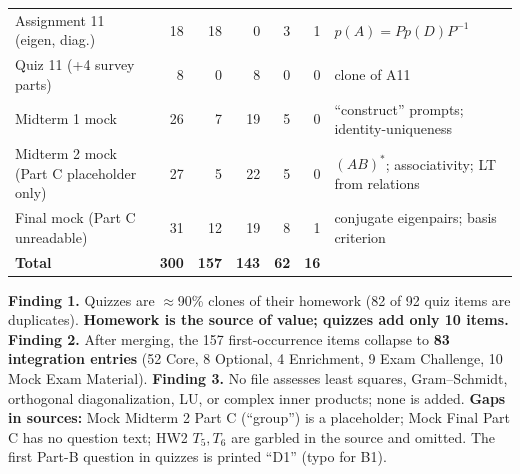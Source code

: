 \documentclass[9pt]{article}
\begin{document}
{\begin{longtable}{@{}p{4.1cm}rrrrr p{6.3cm}@{}}
Assignment 11 (eigen, diag.) & 18 & 18 & 0 & 3 & 1 & $p(A)=Pp(D)P^{-1}$\\
Quiz 11 (+4 survey parts) & 8 & 0 & 8 & 0 & 0 & clone of A11\\\midrule
Midterm 1 mock & 26 & 7 & 19 & 5 & 0 & ``construct'' prompts; identity-uniqueness\\
Midterm 2 mock (Part C placeholder only) & 27 & 5 & 22 & 5 & 0 & $(AB)^*$; associativity; LT from relations\\
Final mock (Part C unreadable) & 31 & 12 & 19 & 8 & 1 & conjugate eigenpairs; basis criterion\\\midrule
\textbf{Total} & \textbf{300} & \textbf{157} & \textbf{143} & \textbf{62} & \textbf{16} & \\\bottomrule
\end{longtable}}
\textbf{Finding 1.} Quizzes are $\approx$90\% clones of their homework (82 of 92 quiz items are duplicates). \textbf{Homework is the source of value; quizzes add only 10 items.} \textbf{Finding 2.} After merging, the 157 first-occurrence items collapse to \textbf{83 integration entries} (52 Core, 8 Optional, 4 Enrichment, 9 Exam Challenge, 10 Mock Exam Material). \textbf{Finding 3.} No file assesses least squares, Gram--Schmidt, orthogonal diagonalization, LU, or complex inner products; none is added. \textbf{Gaps in sources:} Mock Midterm 2 Part C (``group'') is a placeholder; Mock Final Part C has no question text; HW2 $T_5,T_6$ are garbled in the source and omitted. The first Part-B question in quizzes is printed ``D1'' (typo for B1).
\end{document}
